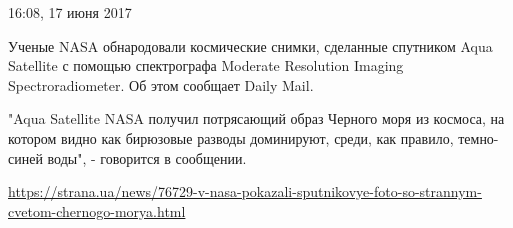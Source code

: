  
 

16:08, 17 июня 2017

Ученые NASA обнародовали космические снимки, сделанные спутником Aqua Satellite
с помощью спектрографа Moderate Resolution Imaging Spectroradiometer. Об этом
сообщает Daily Mail.

"Aqua Satellite NASA получил потрясающий образ Черного моря из космоса, на
котором видно как бирюзовые разводы доминируют, среди, как правило, темно-синей
воды", - говорится в сообщении.

\url{https://strana.ua/news/76729-v-nasa-pokazali-sputnikovye-foto-so-strannym-cvetom-chernogo-morya.html}
